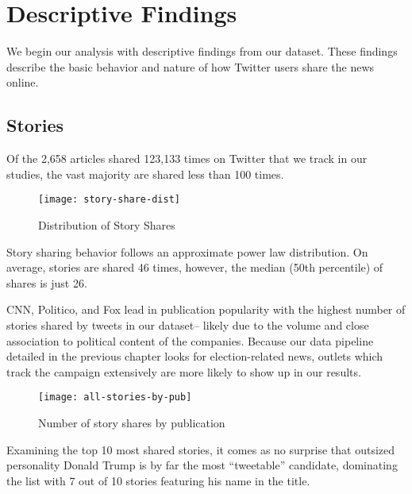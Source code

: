  \chapter{Descriptive Findings}
We begin our analysis with descriptive findings from our dataset.
These findings describe the basic behavior and nature of how Twitter users share the news online.

\section{Stories}
Of the 2,658 articles shared 123,133 times on Twitter that we track in our studies, the vast majority are shared less than 100 times. 


\begin{figure}[H]  
\centering 
  \texttt{[image: story-share-dist]}  
  \caption{Distribution of Story Shares
    \label{fig:story-share-dist}}
\end{figure} 

Story sharing behavior follows an approximate power law distribution. On average, stories are shared 46 times, however, the median (50th percentile) of shares is just 26. 


CNN, Politico, and Fox lead in publication popularity with the highest number of stories shared by tweets in our dataset-- likely due to the volume and close association to political content of the companies. Because our data pipeline detailed in the previous chapter looks for election-related news, outlets which track the campaign extensively are more likely to show up in our results.


\begin{figure}[H]  
\centering 
  \texttt{[image: all-stories-by-pub]}  
  \caption{Number of story shares by publication
    \label{fig:tweets-by-pub}}
\end{figure} 


\newpage %

Examining the top 10 most shared stories, it comes as no surprise that outsized personality Donald Trump is by far the most ``tweetable'' candidate, dominating the list with 7 out of 10 stories featuring his name in the title.

